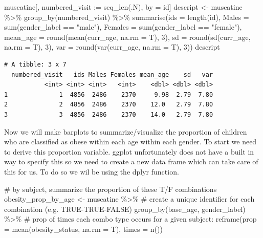 \documentclass[
  letterpaper,
  DIV=11,
  numbers=noendperiod]{scrreprt}
\newenvironment{Shaded}{\begin{snugshade}}{\end{snugshade}}
\newcommand{\AttributeTok}[1]{\textcolor[rgb]{0.40,0.45,0.13}{#1}}
\newcommand{\CommentTok}[1]{\textcolor[rgb]{0.37,0.37,0.37}{#1}}
\newcommand{\DecValTok}[1]{\textcolor[rgb]{0.68,0.00,0.00}{#1}}
\newcommand{\ErrorTok}[1]{\textcolor[rgb]{0.68,0.00,0.00}{#1}}
\newcommand{\FunctionTok}[1]{\textcolor[rgb]{0.28,0.35,0.67}{#1}}
\newcommand{\NormalTok}[1]{\textcolor[rgb]{0.00,0.23,0.31}{#1}}
\newcommand{\OtherTok}[1]{\textcolor[rgb]{0.00,0.23,0.31}{#1}}
\newcommand{\SpecialCharTok}[1]{\textcolor[rgb]{0.37,0.37,0.37}{#1}}
\newcommand{\StringTok}[1]{\textcolor[rgb]{0.13,0.47,0.30}{#1}}
\begin{document}
\begin{Shaded}
\begin{Highlighting}[]
\NormalTok{muscatine[, numbered\_visit }\SpecialCharTok{:}\ErrorTok{=} \FunctionTok{seq\_len}\NormalTok{(.N), by }\OtherTok{=}\NormalTok{ id]}
\NormalTok{descript }\OtherTok{\textless{}{-}}\NormalTok{ muscatine }\SpecialCharTok{\%\textgreater{}\%}
    \FunctionTok{group\_by}\NormalTok{(numbered\_visit) }\SpecialCharTok{\%\textgreater{}\%}
    \FunctionTok{summarise}\NormalTok{(}\AttributeTok{ids =} \FunctionTok{length}\NormalTok{(id), }\AttributeTok{Males =} \FunctionTok{sum}\NormalTok{(gender\_label }\SpecialCharTok{==} \StringTok{"male"}\NormalTok{), }\AttributeTok{Females =} \FunctionTok{sum}\NormalTok{(gender\_label }\SpecialCharTok{==}
        \StringTok{"female"}\NormalTok{), }\AttributeTok{mean\_age =} \FunctionTok{round}\NormalTok{(}\FunctionTok{mean}\NormalTok{(curr\_age, }\AttributeTok{na.rm =}\NormalTok{ T), }\DecValTok{3}\NormalTok{), }\AttributeTok{sd =} \FunctionTok{round}\NormalTok{(}\FunctionTok{sd}\NormalTok{(curr\_age,}
        \AttributeTok{na.rm =}\NormalTok{ T), }\DecValTok{3}\NormalTok{), }\AttributeTok{var =} \FunctionTok{round}\NormalTok{(}\FunctionTok{var}\NormalTok{(curr\_age, }\AttributeTok{na.rm =}\NormalTok{ T), }\DecValTok{3}\NormalTok{))}
\NormalTok{descript}
\end{Highlighting}
\end{Shaded}

\begin{verbatim}
# A tibble: 3 x 7
  numbered_visit   ids Males Females mean_age    sd   var
           <int> <int> <int>   <int>    <dbl> <dbl> <dbl>
1              1  4856  2486    2370     9.98  2.79  7.80
2              2  4856  2486    2370    12.0   2.79  7.80
3              3  4856  2486    2370    14.0   2.79  7.80
\end{verbatim}

Now we will make barplots to summarize/visualize the proportion of
children who are classified as obese within each age within each gender.
To start we need to derive this proportion variable. ggplot
unfortunately does not have a built in way to specify this so we need to
create a new data frame which can take care of this for us. To do so we
wil be using the dplyr function.

\begin{Shaded}
\begin{Highlighting}[]
\CommentTok{\# by subject, summarize the proportion of these T/F combinations}
\NormalTok{obesity\_prop\_by\_age }\OtherTok{\textless{}{-}}\NormalTok{ muscatine }\SpecialCharTok{\%\textgreater{}\%}
    \CommentTok{\# create a unique identifier for each combination (e.g. \textquotesingle{}TRUE{-}TRUE{-}FALSE\textquotesingle{})}
\FunctionTok{group\_by}\NormalTok{(base\_age, gender\_label) }\SpecialCharTok{\%\textgreater{}\%}
    \CommentTok{\# prop of times each combo type occurs for a given subject:}
\FunctionTok{reframe}\NormalTok{(}\AttributeTok{prop =} \FunctionTok{mean}\NormalTok{(obesity\_status, }\AttributeTok{na.rm =}\NormalTok{ T), }\AttributeTok{times =} \FunctionTok{n}\NormalTok{())}
\end{Highlighting}
\end{Shaded}
\end{document}
